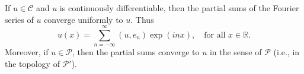 If $u \in \mathcal{C}$ and $u$ is continuously differentiable, then the partial sums of the Fourier series of $u$ converge uniformly to $u$. Thus
$$u(x) = \sum_{n=-\infty}^{\infty} (u, e_n) \exp(inx), \quad \text{for all } x \in \mathbb{R}.$$
Moreover, if $u \in \mathcal{P}$, then the partial sums converge to $u$ in the sense of $\mathcal{P}$ (i.e., in the topology of $\mathcal{P}'$).
